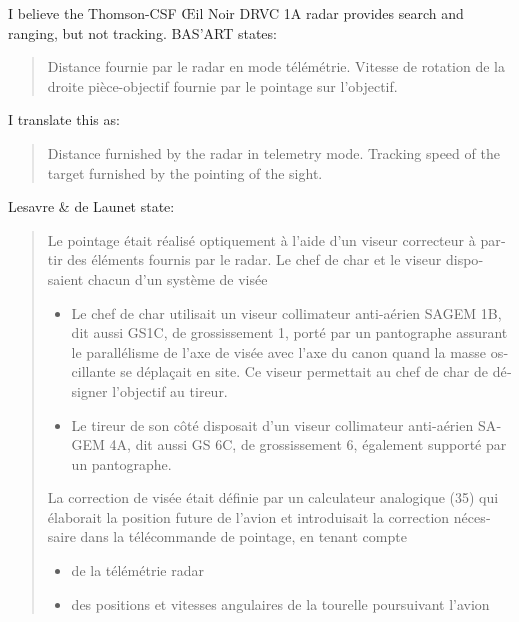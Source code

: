 \begin{withcounters}
{        I believe the Thomson-CSF \foreignlanguage{french}{Œil Noir} DRVC 1A radar provides search and ranging, but not tracking. BAS'ART states:
        \begin{quote}
            \begin{otherlanguage}{french}
                Distance fournie par le radar en mode télémétrie. Vitesse de rotation de la droite pièce-objectif fournie par le pointage sur l’objectif.
            \end{otherlanguage}
        \end{quote}
        I translate this as:
        \begin{quote}
            Distance furnished by the radar in telemetry mode.
            Tracking speed of the target furnished by the pointing of the sight.
        \end{quote}
        Lesavre \& de Launet state:
        \begin{quote}
            \begin{otherlanguage}{french}
                Le pointage était réalisé optiquement à l’aide d’un viseur correcteur à
                partir des éléments fournis par le radar. Le chef de char et le viseur disposaient
                chacun d’un système de visée
                \begin{itemize}
                    \item Le chef de char utilisait un viseur collimateur anti-aérien SAGEM 1B, dit
                        aussi GS1C, de grossissement 1, porté par un pantographe assurant le parallélisme de
                        l’axe de visée avec l’axe du canon quand la masse oscillante se déplaçait en site. Ce
                        viseur permettait au chef de char de désigner l’objectif au tireur.
                    \item
                        Le tireur de son côté disposait d’un viseur collimateur anti-aérien SAGEM
                        4A, dit aussi GS 6C, de grossissement 6, également supporté par un pantographe.
                \end{itemize}
                La correction de visée était définie par un calculateur analogique (35) qui
                élaborait la position future de l’avion et introduisait la correction nécessaire dans la
                télécommande de pointage, en tenant compte
                \begin{itemize}
                    \item de la télémétrie radar
                    \item des positions et vitesses angulaires de la tourelle poursuivant l’avion

\end{itemize}
\end{otherlanguage}
\end{quote}}
\end{withcounters}
